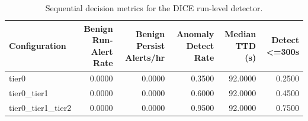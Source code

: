 \begin{table}[t]
\centering
\caption{Sequential decision metrics for the DICE run-level detector.}
\label{tab:dice_sequential_metrics}
\footnotesize
\begin{tabular}{lrrrrr}
\toprule
Configuration & Benign Run-Alert Rate & Benign Persist Alerts/hr & Anomaly Detect Rate & Median TTD (s) & Detect <=300s \\
\midrule
tier0 & 0.0000 & 0.0000 & 0.3500 & 92.0000 & 0.2500 \\
tier0_tier1 & 0.0000 & 0.0000 & 0.6000 & 92.0000 & 0.4500 \\
tier0_tier1_tier2 & 0.0000 & 0.0000 & 0.9500 & 92.0000 & 0.7500 \\
\bottomrule
\end{tabular}

\end{table}
